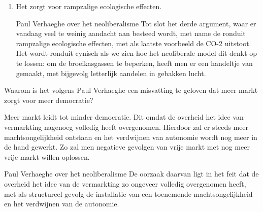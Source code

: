 \documentclass[main.tex]{subfiles}
\begin{document}
\begin{examenvraag}
\begin{antwoord}
\begin{enumerate}
		\item Het zorgt voor rampzalige ecologische effecten.
		\begin{citaat}{Paul Verhaeghe over het neoliberalisme}
		Tot slot het derde argument, waar er vandaag veel te weinig aandacht aan besteed wordt, met
name de ronduit rampzalige ecologische effecten, met als laatste voorbeeld de CO-2 uitstoot. Het
wordt ronduit cynisch als we zien hoe het neoliberale model dit denkt op te lossen: om de
broeikasgassen te beperken, heeft men er een handeltje van gemaakt, met bijgevolg letterlijk aandelen
in gebakken lucht.
		\end{citaat}
    \end{enumerate}
    \end{antwoord}
\end{examenvraag}


\begin{examenvraag}
    \begin{vraag}
        Waarom is het volgens Paul Verhaeghe een misvatting te geloven dat meer markt zorgt voor meer democratie?
    \end{vraag}

    \begin{antwoord}
   Meer markt leidt tot minder democratie.‭ ‬Dit omdat de overheid het idee van 
   vermarkting nagenoeg volledig heeft overgenomen.‭ ‬Hierdoor zal er steeds meer 
   machtsongelijkheid ontstaan en het verdwijnen van autonomie wordt nog meer in 
   de hand gewerkt.‭ ‬Zo zal men negatieve gevolgen van vrije markt met nog meer 
   vrije markt willen oplossen.
    
\begin{citaat}{Paul Verhaeghe over het neoliberalisme}
De oorzaak daarvan ligt in het feit dat de overheid het idee van de vermarkting zo
ongeveer volledig overgenomen heeft, met als structureel gevolg de installatie van een toenemende
machtsongelijkheid en het verdwijnen van de autonomie.
\end{citaat}
    \end{antwoord}
\end{examenvraag}
\end{document}
